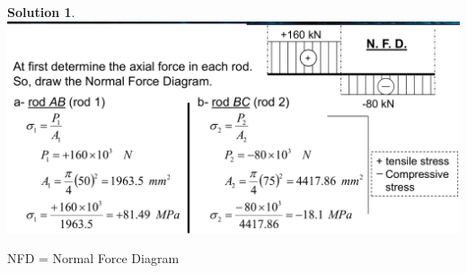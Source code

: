 \documentclass[11pt]{article}
\theoremstyle{definition}
\newtheorem{sln}{Solution}
\begin{document}
\begin{sln}
\includegraphics[scale=0.5]{figures/2021-03-30_22-40.png}
\end{sln}
NFD = Normal Force Diagram
\end{document}
